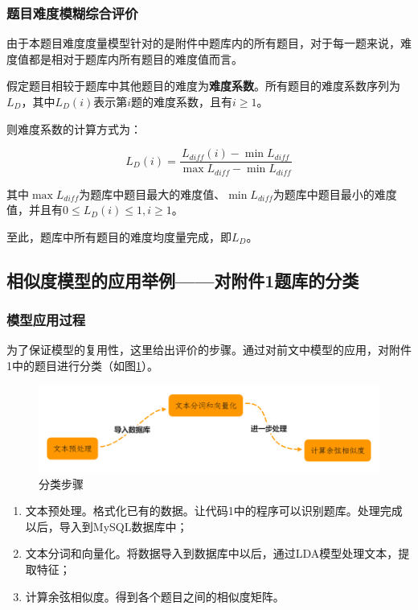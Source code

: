 \subsubsection{题目难度模糊综合评价}

由于本题目难度度量模型针对的是附件中题库内的所有题目，对于每一题来说，难度值都是相对于题库内所有题目的难度值而言。

假定题目相较于题库中其他题目的难度为\textbf{难度系数}。所有题目的难度系数序列为$L_D$，其中$L_D(i)$表示第$i$题的难度系数，且有$i \geq 1$。

则难度系数的计算方式为：

\begin{equation}
L_D(i) = 
    \frac{
        L_{diff}(i) - \min L_{diff}
    } {
        \max L_{diff} - \min L_{diff}
    }
\end{equation}

其中$\max L_{diff}$为题库中题目最大的难度值、$\min L_{diff}$为题库中题目最小的难度值，并且有$0 \leq L_D(i) \leq 1, i \geq 1$。

至此，题库中所有题目的难度均度量完成，即$L_D$。

\subsection{相似度模型的应用举例——对附件1题库的分类}

\subsubsection{模型应用过程}

为了保证模型的复用性，这里给出评价的步骤。通过对前文中模型的应用，对附件1中的题目进行分类（如图\ref{figure041640}）。

\begin{figure}[h]
    \centering
    \includegraphics[scale=0.35]{res/figure041640.png}
    \caption{分类步骤}
    \label{figure041640}
\end{figure}

\begin{enumerate}
    \item 文本预处理。格式化已有的数据。让代码1中的程序可以识别题库。处理完成以后，导入到MySQL数据库中；
    \item 文本分词和向量化。将数据导入到数据库中以后，通过LDA模型处理文本，提取特征；
    \item 计算余弦相似度。得到各个题目之间的相似度矩阵。
\end{enumerate}


